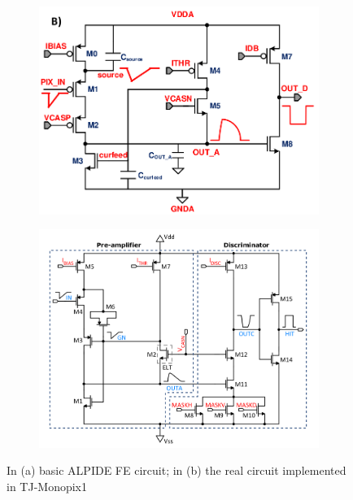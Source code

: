             \begin{figure}
                \centering
                \begin{subfigure}[b]{0.49\textwidth}
                    \centering
                    \includegraphics[width=\linewidth]{figures/Monopix1/ALPIDE_FE.png}
                    \caption{}
                    \label{fig:ALPIDE}
                \end{subfigure}
                \hfill
                \begin{subfigure}[b]{0.49\textwidth}
                    \centering
                    \includegraphics[width=\linewidth]{figures/Monopix1/Monopix1_FE_circuit.png}
                    \caption{}
                    \label{fig:Monopix}
                \end{subfigure}
                \caption{In (a) basic ALPIDE FE circuit; in (b) the real circuit implemented in TJ-Monopix1}
                \label{fig:Monopix1_FE_circuit}
                \end{figure} 
            

